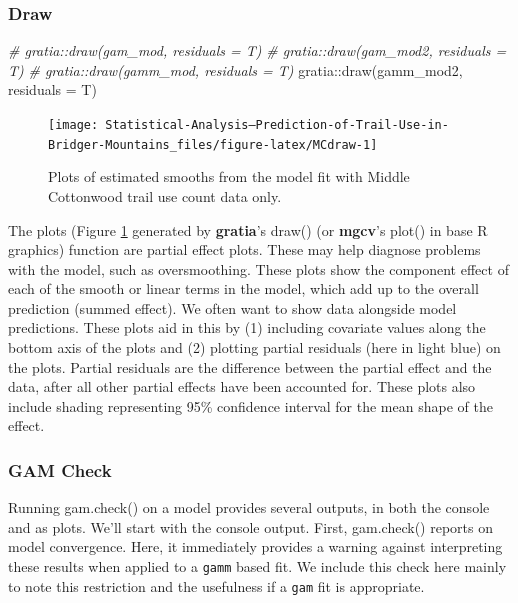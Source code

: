 \documentclass[
]{book}
\newenvironment{Shaded}{\begin{snugshade}}{\end{snugshade}}
\newcommand{\AttributeTok}[1]{\textcolor[rgb]{0.77,0.63,0.00}{#1}}
\newcommand{\CommentTok}[1]{\textcolor[rgb]{0.56,0.35,0.01}{\textit{#1}}}
\newcommand{\FunctionTok}[1]{\textcolor[rgb]{0.00,0.00,0.00}{#1}}
\newcommand{\NormalTok}[1]{#1}
\newcommand{\SpecialCharTok}[1]{\textcolor[rgb]{0.00,0.00,0.00}{#1}}
\begin{document}
\hypertarget{draw}{%
\subsubsection{Draw}\label{draw}}

\begin{Shaded}
\begin{Highlighting}[]
\CommentTok{\# gratia::draw(gam\_mod, residuals = T)}
\CommentTok{\# gratia::draw(gam\_mod2, residuals = T)}
\CommentTok{\# gratia::draw(gamm\_mod, residuals = T)}
\NormalTok{gratia}\SpecialCharTok{::}\FunctionTok{draw}\NormalTok{(gamm\_mod2, }\AttributeTok{residuals =}\NormalTok{ T)}
\end{Highlighting}
\end{Shaded}

\begin{figure}

{\centering \texttt{[image: Statistical-Analysis--Prediction-of-Trail-Use-in-Bridger-Mountains\_files/figure-latex/MCdraw-1]} 

}

\caption{Plots of estimated smooths from the model fit with Middle Cottonwood trail use count data only.}\label{fig:MCdraw}
\end{figure}

The plots (Figure \ref{fig:MCdraw} generated by \textbf{gratia}'s draw() (or \textbf{mgcv}'s plot() in base R graphics) function are partial effect plots. These may help diagnose problems with the model, such as oversmoothing. These plots show the component effect of each of the smooth or linear terms in the model, which add up to the overall prediction (summed effect). We often want to show data alongside model predictions. These plots aid in this by (1) including covariate values along the bottom axis of the plots and (2) plotting partial residuals (here in light blue) on the plots. Partial residuals are the difference between the partial effect and the data, after all other partial effects have been accounted for. These plots also include shading representing 95\% confidence interval for the mean shape of the effect.

\hypertarget{gam-check}{%
\subsubsection{GAM Check}\label{gam-check}}

Running gam.check() on a model provides several outputs, in both the console and as plots. We'll start with the console output. First, gam.check() reports on model convergence. Here, it immediately provides a warning against interpreting these results when applied to a \texttt{gamm} based fit. We include this check here mainly to note this restriction and the usefulness if a \texttt{gam} fit is appropriate.
\end{document}
